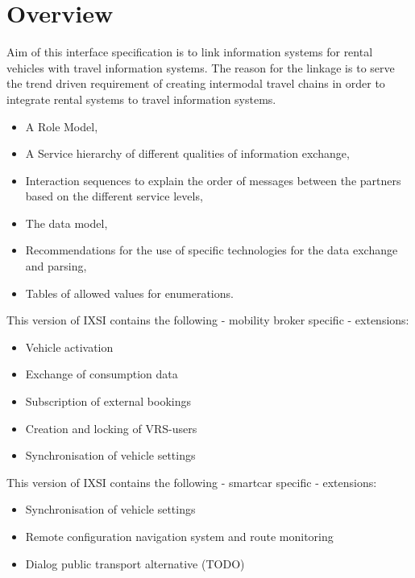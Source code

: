 \chapter{Overview}
\label{cha:Zusammenfassung}

Aim of this interface specification is to link information systems for rental vehicles with travel information systems.
The reason for the linkage is to serve the trend driven requirement of creating intermodal travel chains in order to integrate rental systems to travel information systems.

\begin{itemize}
\item A Role Model,
\item A Service hierarchy of different qualities of information exchange,
\item Interaction sequences to explain the order of messages between the partners based on the different service levels,
\item The data model,
\item Recommendations for the use of specific technologies for the data exchange and parsing,
\item Tables of allowed values for enumerations.
\end{itemize}
This version of IXSI contains the following - mobility broker specific - extensions:
\begin{itemize}
	\item Vehicle activation 
	\item Exchange of consumption data 
	\item Subscription of external bookings
	\item Creation and locking of VRS-users
	\item Synchronisation of vehicle settings 
\end{itemize}
This version of IXSI contains the following -  smartcar specific - extensions:
\begin{itemize}
	\item Synchronisation of vehicle settings
	\item Remote configuration navigation system and route monitoring
	\item Dialog public transport alternative (TODO)
\end{itemize}
